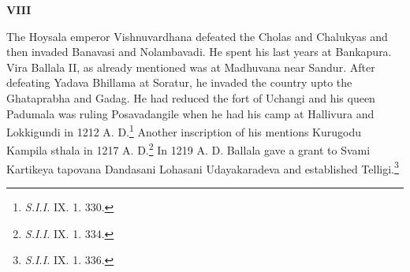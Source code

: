 \documentclass{book}
\begin{document}
\medskip
\begin{center}
{\bf VIII}
\end{center}
\smallskip

The Hoysala emperor Vishnuvardhana defeated the Cholas and Chalukyas and then invaded Banavasi and Nolambavadi. He spent his last years at Bankapura. Vira Ballala II, as already mentioned was at Madhuvana near Sandur. After defeating Yadava Bhillama at Soratur, he invaded the country upto the Ghataprabha and Gadag. He had reduced the fort of Uchangi and his queen Padumala was ruling Posavadangile when he had his camp at Hallivura and Lokkigundi in 1212 A. D.\footnote[33]{{\em S.I.I.} IX. 1. 330.} Another inscription of his mentions Kurugodu Kampila sthala in 1217 A. D.\footnote[34]{{\em S.I.I.} IX. 1. 334.} In 1219 A. D. Ballala gave a grant to Svami Kartikeya tapovana Dandasani Lohasani Udayakaradeva and established Telligi.\footnote[35]{{\em S.I.I.} IX. 1. 336.}  
\end{document}

